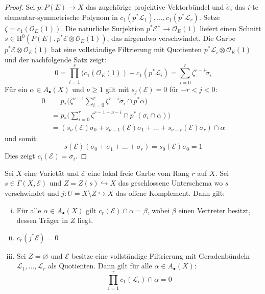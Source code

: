 \documentclass[10pt,a4paper]{article}
\begin{document}
\begin{proof}
Sei $p:P(E)\to X$ das zugehörige projektive Vektorbündel und $\tilde{\sigma}_i$ das $i$-te elementar-symmetrische Polynom in $c_1(p^\ast\mathcal{L}_1),\ldots,c_1(p^\ast\mathcal{L}_r)$. Setze $\zeta = c_1(\mathcal{O}_E(1))$. Die natürliche Surjektion $p^\ast\mathcal{E}^\vee\to \mathcal{O}_E(1)$ liefert einen Schnitt $s\in\mathrm{H}^0(P(E), p^\ast\mathcal{E}\otimes \mathcal{O}_E(1))$, das nirgendwo verschwindet. Die Garbe $p^\ast\mathcal{E}\otimes\mathcal{O}_E(1)$ hat eine vollständige Filtrierung mit Quotienten $p^\ast\mathcal{L}_i\otimes\mathcal{O}_E(1)$ und der nachfolgende Satz zeigt:
\[ 0 = \prod_{i=1}^{r}(c_1(\mathcal{O}_E(1)) + c_1(p^\ast\mathcal{L}_i) = \sum_{i=0}^r\zeta^{r-i}\tilde{\sigma}_i\]
Für ein $\alpha\in A_\bullet(X)$ und $\nu\geq 1$ gilt mit $s_j(\mathcal{E}) = 0$ für $-r<j<0$:
\begin{align*}
0 &= p_\ast\Big(\zeta^{\nu-1}\sum_{i=0}^r\zeta^{r-i}\tilde{\sigma}_i\cap p^\ast\alpha\Big)\\
&= p_\ast\Big(\sum_{i=0}^r \zeta^{r-1+\nu-i}\cap p^\ast(\sigma_i\cap\alpha)\Big)\\
&= (s_\nu(\mathcal{E})\sigma_0 + s_{\nu-1}(\mathcal{E})\sigma_1 + \ldots + s_{\nu-r}(\mathcal{E})\sigma_r)\cap \alpha
\end{align*}
und somit:
\[ s(\mathcal{E})(\sigma_0+\sigma_1+\ldots+\sigma_r) = s_0(\mathcal{E})\sigma_0 = 1 \]
Dies zeigt $c_i(\mathcal{E}) = \sigma_i$.
\end{proof}

\begin{proposition}
Sei $X$ eine Varietät und $\mathcal{E}$ eine lokal freie Garbe vom Rang $r$ auf $X$. Sei $s\in\Gamma(X,\mathcal{E})$ und $Z=Z(s)\hookrightarrow X$ das geschlossene Unterschema wo $s$ verschwindet und $j:U=X\setminus Z\hookrightarrow X$ das offene Komplement. Dann gilt:
\begin{enumerate}[(i)]
\item Für alle $\alpha\in A_\bullet(X)$ gilt $c_r(\mathcal{E})\cap\alpha = \beta$, wobei $\beta$ einen Vertreter besitzt, dessen Träger in $Z$ liegt.
\item $c_r(j^\ast\mathcal{E}) = 0$
\item Sei $Z=\varnothing$ und $\mathcal{E}$ besitze eine vollständige Filtrierung mit Geradenbündeln $\mathcal{L}_1,\ldots,\mathcal{L}_r$ als Quotienten. Dann gilt für alle $\alpha\in A_\bullet(X)$:
\[ \prod_{i=1}^r c_1(\mathcal{L}_i)\cap\alpha = 0 \]
\end{enumerate}
\end{proposition}
\end{document}
